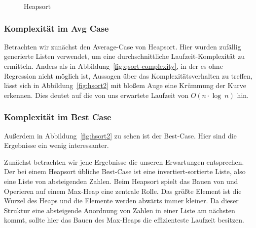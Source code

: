 \begin{figure}[hbt]
    \centering
    \caption{Heapsort}
\end{figure}

\subsubsection{Komplexität im Avg Case}\label{subsubsec:komplexitaet-im average-case}

Betrachten wir zunächst den Average-Case von Heapsort.
Hier wurden zufällig generierte Listen verwendet, um eine durchschnittliche
Laufzeit-Komplexität zu ermitteln.
Anders als in Abbildung~\ref{fig:qsort-complexity}, in der es ohne Regression
nicht möglich ist, Aussagen über das Komplexitätsverhalten zu treffen, lässt
sich in Abbildung~\ref{fig:hsort2} mit bloßem Auge eine Krümmung der Kurve
erkennen.
Dies deutet auf die von uns erwartete Laufzeit von \(O(n\cdot \log\ n)\) hin.

\subsubsection{Komplexität im Best Case}\label{subsubsec:komplexitaet-im-best -case}

Außerdem in Abbildung~\ref{fig:hsort2} zu sehen ist der Best-Case.
Hier sind die Ergebnisse ein wenig interessanter.

Zunächst betrachten wir jene Ergebnisse die unseren Erwartungen entsprechen.
Der bei einem Heapsort übliche Best-Case ist eine invertiert-sortierte Liste,
also eine Liste von absteigenden Zahlen.
Beim Heapsort spielt das Bauen von und Operieren auf einem Max-Heap eine
zentrale Rolle.
Das größte Element ist die Wurzel des Heaps und die Elemente werden abwärts
immer kleiner.
Da dieser Struktur eine absteigende Anordnung von Zahlen in einer Liste am
nächsten kommt, sollte hier das Bauen des Max-Heaps die effizienteste
Laufzeit besitzen.

